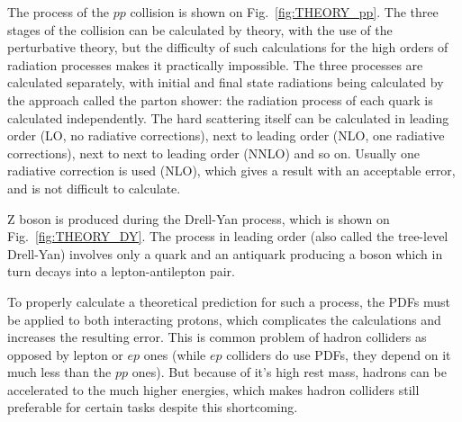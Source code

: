 The process of the $pp$ collision is shown on Fig.~\ref{fig:THEORY_pp}. The three stages of the collision can be calculated by theory, with the use of the perturbative theory, but the difficulty of such calculations for the high orders of radiation processes makes it practically impossible. The three processes are calculated separately, with initial and final state radiations being calculated by the approach called the parton shower: the radiation process of each quark is calculated independently. The hard scattering itself can be calculated in leading order (LO, no radiative corrections), next to leading order (NLO, one radiative corrections), next to next to leading order (NNLO) and so on. Usually one radiative correction is used (NLO), which gives a result with an acceptable error, and is not difficult to calculate.

\begin{figure}
\end{figure}

Z boson is produced during the Drell-Yan process, which is shown on Fig.~\ref{fig:THEORY_DY}. The process in leading order (also called the tree-level Drell-Yan) involves only a quark and an antiquark producing a boson which in turn decays into a lepton-antilepton pair.

To properly calculate a theoretical prediction for such a process, the PDFs must be applied to both interacting protons, which complicates the calculations and increases the resulting error. This is common problem of hadron colliders as opposed by lepton or $ep$ ones (while $ep$ colliders do use PDFs, they depend on it much less than the $pp$ ones). But because of it's high rest mass, hadrons can be accelerated to the much higher energies, which makes hadron colliders still preferable for certain tasks despite this shortcoming.

